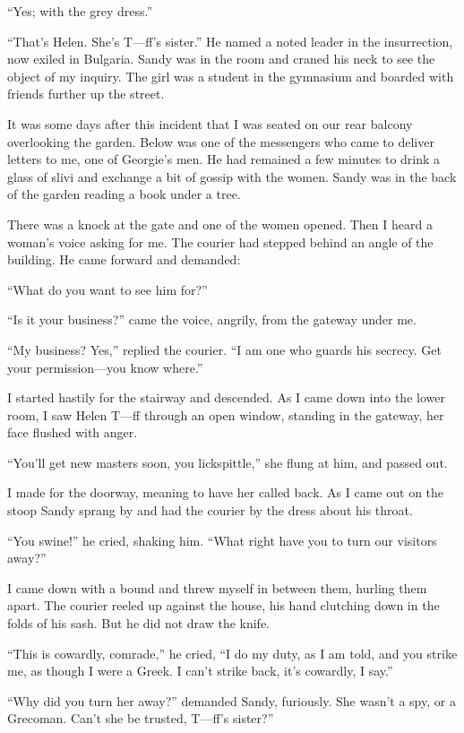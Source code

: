 \documentclass[a5paper,12pt]{book}
\begin{document}
“Yes; with the grey dress.”

“That's Helen. She's T—ff's sister.” He named a noted leader in the insurrection, now exiled in Bulgaria. Sandy was in the room and craned his neck to see the object of my inquiry. The girl was a student in the gymnasium and boarded with friends further up the street. 

It was some days after this incident that I was seated on our rear balcony overlooking the garden. Below was one of the messengers who came to deliver letters to me, one of Georgie’s men. He had remained a few minutes to drink a glass of slivi and exchange a bit of gossip with the women. Sandy was in the back of the garden reading a book under a tree. 

There was a knock at the gate and one of the women opened. Then I heard a woman's voice asking for me. The courier had stepped behind an angle of the building. He came forward and demanded:

“What do you want to see him for?”

“Is it your business?” came the voice, angrily, from the gateway under me. 

“My business? Yes,” replied the courier. “I am one who guards his secrecy. Get your permission—you know where.”

I started hastily for the stairway and descended. As I came down into the lower room, I saw Helen T—ff through an open window, standing in the gateway, her face flushed with anger. 

“You'll get new masters soon, you lickspittle,” she flung at him, and passed out. 

I made for the doorway, meaning to have her called back. As I came out on the stoop Sandy sprang by and had the courier by the dress about his throat. 

“You swine!” he cried, shaking him. “What right have you to turn our visitors away?”

I came down with a bound and threw myself in between them, hurling them apart. The courier reeled up against the house, his hand clutching down in the folds of his sash. But he did not draw the knife. 

“This is cowardly, comrade,” he cried, “I do my duty, as I am told, and you strike me, as though I were a Greek. I can’t strike back, it’s cowardly, I say.”

“Why did you turn her away?” demanded Sandy, furiously. She wasn’t a spy, or a Grecoman. Can’t she be trusted, T—ff’s sister?”
\end{document}
